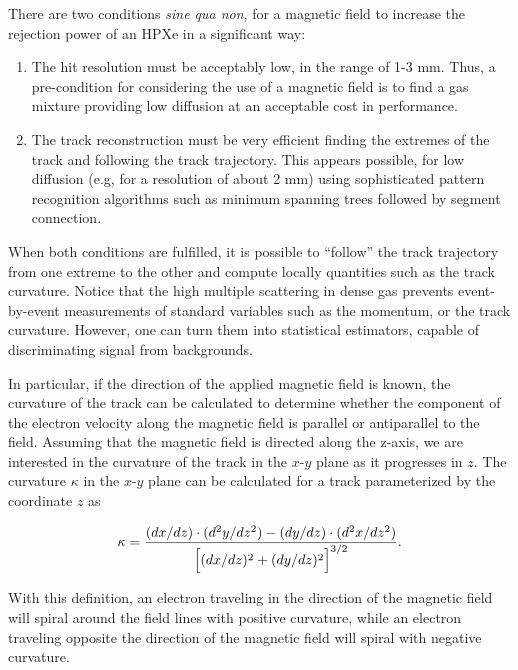 There are two conditions {\em sine qua non}, for a magnetic field to increase the rejection power of an HPXe in a significant way:

\begin{enumerate}
\item The hit resolution must be acceptably low, in the range of 1-3 mm. Thus, a pre-condition for considering the use of a magnetic field is to find a gas mixture providing  low diffusion at an acceptable cost in performance.
\item The track reconstruction must be very efficient finding the extremes of the track and following the track trajectory. This appears possible, for low diffusion (e.g, for a resolution of about 2 mm) using sophisticated pattern recognition algorithms such as minimum spanning trees followed by segment connection.  
\end{enumerate}

When both conditions are fulfilled, it is possible to ``follow'' the track trajectory from one extreme to the other and compute locally quantities such as the track curvature. Notice that the high multiple scattering in dense gas prevents event-by-event measurements of standard variables such as the momentum, or the track curvature. However, one can turn them into statistical estimators, capable of discriminating signal from backgrounds. 

In particular, if the direction of the applied magnetic field is known, the curvature of the track can be calculated to determine whether the component of the electron velocity along the magnetic field is parallel or antiparallel to the field.  Assuming that the magnetic field is directed along the z-axis, we are interested in the curvature of the track in the $x$-$y$ plane as it progresses in $z$.  The curvature $\kappa$ in the $x$-$y$ plane can be calculated for a track parameterized by the coordinate $z$ as

\begin{equation}\label{eqn_curv}
\kappa = \frac{(dx/dz)\cdot(d^2y/dz^2) - (dy/dz)\cdot(d^2x/dz^2)}{\Bigl[(dx/dz)^2 + (dy/dz)^2\Bigr]^{3/2}}.
\end{equation}

With this definition, an electron traveling in the direction of the magnetic field will spiral around the field lines with positive curvature, while an electron traveling opposite the direction of the magnetic field will spiral with negative curvature.  

